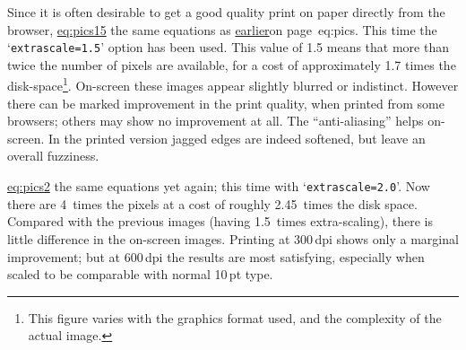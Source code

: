 \noindent
Since it is often desirable to get a good quality print on paper
directly from the browser, \hyperref{here are}{Figure~}{ shows}{eq:pics15}
the same equations as \hyperref[page]{earlier}{on page~}{}{eq:pics}.
This time the `\texttt{extrascale=1.5}' option has been used. This value of 1.5
means that more than twice the number of pixels are available,
for a cost of approximately 1.7 times the disk-space\footnote{This figure
varies with the graphics format used, and the complexity of the actual image.}.
\noindent
On-screen these images appear slightly blurred or indistinct. 
However there can be marked improvement in the print quality,
when printed from some browsers; others may show no improvement at all. 
The ``anti-aliasing'' helps on-screen. In the printed version
jagged edges are indeed softened, but leave an overall fuzziness. 


\hyperref{Here are}{Figure~}{ shows}{eq:pics2} 
the same equations yet again; this time with `\texttt{extrascale=2.0}'.
Now there are 4~times the pixels at a cost of roughly 2.45~times the disk space.
Compared with the previous images (having 1.5~times extra-scaling), 
there is little difference in the on-screen images.
Printing at 300\,dpi shows only a marginal improvement;
but at 600\,dpi the results are most satisfying, especially when
scaled to be comparable with normal 10\,pt type.

